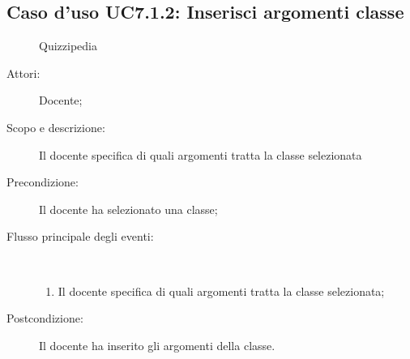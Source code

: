 \subsection{Caso d'uso UC7.1.2: Inserisci argomenti classe}
	\begin{figure}[H]
		\centering
		\begin{resizedtikzpicture}{\textwidth}
		\begin{umlsystem}[x=0, fill=lightgray!20]{Quizzipedia}
		\end{umlsystem}
		\end{resizedtikzpicture}
		\caption{}
	\end{figure}
\begin{description}
\item[Attori:] Docente;
\item[Scopo e descrizione:] Il docente specifica di quali argomenti tratta la classe selezionata
      \item[Precondizione:] Il docente ha selezionato una classe;

        \item[Flusso principale degli eventi:] \ 
 \begin{enumerate}
          \item Il docente specifica di quali argomenti tratta la classe selezionata;

      \end{enumerate}
    \item[Postcondizione:] Il docente ha inserito gli argomenti della classe.
  \end{description}
\hypertarget{UC7.1.3}{}
